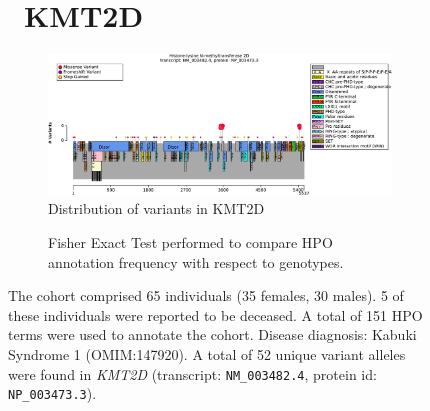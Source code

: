 \begin{figure}[htbp]
\section*{ KMT2D}
\centering
\begin{subfigure}[b]{0.95\textwidth}
\centering
\includegraphics[width=\textwidth]{ img/KMT2D_protein_diagram.pdf} 
\captionsetup{justification=raggedright,singlelinecheck=false}
\caption{Distribution of variants in KMT2D}
\end{subfigure}

\vspace{2em}

\begin{subfigure}[b]{0.95\textwidth}
\centering
{}
\captionsetup{justification=raggedright,singlelinecheck=false}
\caption{Fisher Exact Test performed to compare HPO annotation frequency with respect to genotypes. }
\end{subfigure}

\vspace{2em}

\caption{
The cohort comprised 65 individuals (35 females, 30 males).
5 of these individuals were reported to be deceased.
A total of 151 HPO terms were used to annotate the cohort.
Disease diagnosis: Kabuki Syndrome 1 (OMIM:147920).
A total of 52 unique variant alleles were found in \textit{KMT2D} (transcript: \texttt{NM\_003482.4}, protein id: \texttt{NP\_003473.3}).
}
\end{figure}
